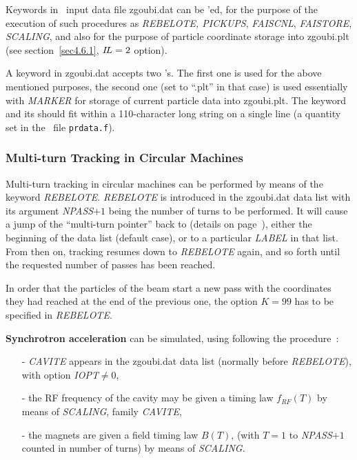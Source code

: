 Keywords in \zgou\ input data file zgoubi.dat can be \LABEL'ed, for the purpose of 
the execution of such procedures as  \textsl{REBELOTE,  PICKUPS}, 
\textsl{FAISCNL}, \textsl{FAISTORE}, 
 \textsl{SCALING}, and also for the purpose of 
particle coordinate storage into zgoubi.plt (see section~\ref{sec4.6.1}, 
$I\!L=2$ option). 

\medskip 

\noindent A keyword in zgoubi.dat accepts two \LABEL's. The first one is used for the 
above mentioned purposes, the second one (set to ``.plt'' in that case) is used essentially 
 with \textsl{MARKER} for storage of current particle data 
into zgoubi.plt. The keyword and its \LABEL['s] should fit within a 110-character 
long string on a single line (a quantity set in the \FORTRAN\ file \texttt{prdata.f}). 

\subsubsection{Multi-turn Tracking in Circular Machines \label{sec4.6.5} }

Multi-turn tracking  in circular machines can be performed by
means of the keyword \textsl{REBELOTE}. \textsl{REBELOTE} is introduced in 
the  zgoubi.dat data list with its argument \textsl{NPASS}$+1$ being the number of turns to be 
performed. 
It will cause a jump of  the ``multi-turn pointer''  back to (details on page~\pageref{REBELOTE}), 
either the beginning of the data list (default case), or to a particular \textsl{LABEL} 
in that list. From then on, tracking resumes down to \textsl{REBELOTE} again, and so forth until the 
requested number of passes has been reached. 

\medskip

\noindent In order that the \IMAX{} particles of the beam start a new 
pass with the coordinates they had reached at the end of the 
previous one, the option $ K=99 $ has to be specified in \textsl{REBELOTE}.

\medskip


\noindent\textbf{Synchrotron acceleration} can be simulated, using following the procedure~: 
\begin{itemize}
\item[-] \textsl{CAVITE} appears in the zgoubi.dat data list (normally before
\textsl{REBELOTE}), with option \textsl{IOPT}$\neq 0$, 

\item[-] the RF frequency of the cavity may be given a timing law $f_{RF}(T)$ by 
means of \textsl{SCALING}, family \textsl{CAVITE}, 

\item[-] the magnets are given a field  timing law $ B(T)$,  
(with $T=1 $ to \textsl{NPASS}$+1$  counted in number of turns) by means of \textsl{SCALING}. \par
\end{itemize}

